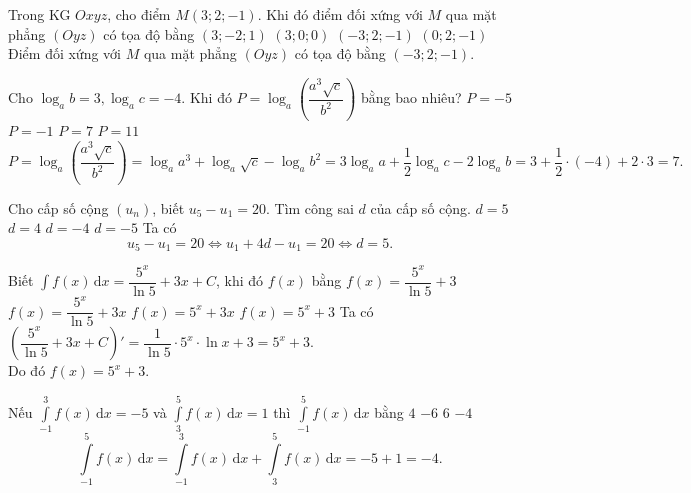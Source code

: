 \begin{ex}%
Trong KG $Oxyz$, cho điểm $M(3;2;-1)$. Khi đó điểm đối xứng với $M$ qua mặt phẳng $(Oyz)$ có tọa độ bằng
\choice 
{$(3;-2;1)$} 
{$(3;0;0)$}
{\True $(-3;2;-1)$} 
{$(0;2;-1)$}
\loigiai
{
Điểm đối xứng với $M$ qua mặt phẳng $(Oyz)$ có tọa độ bằng $(-3;2;-1)$.
}
\end{ex}

\begin{ex}%
Cho $\log_{a}b=3,\log_{a}c=-4$. Khi đó $P=\log_{a}\left (\dfrac{a^3\sqrt{c}}{b^2} \right )$ bằng bao nhiêu?
\choice 
{$P=-5$} 
{$P=-1$}
{\True $P=7$} 
{$P=11$}
\loigiai
{
$$P=\log_{a}\left (\dfrac{a^3\sqrt{c}}{b^2} \right )=\log_{a}a^3+\log_{a}\sqrt{c}-\log_{a}b^2=3\log_{a}a+\dfrac{1}{2}\log_{a}c-2\log_{a}b=3+\dfrac{1}{2}\cdot (-4)+2\cdot 3=7.$$
}
\end{ex}

\begin{ex}%
Cho cấp số cộng $\left (u_n \right )$, biết $u_5-u_1=20$. Tìm công sai $d$ của cấp số cộng.
\choice 
{\True $d=5$} 
{$d=4$}
{$d=-4$} 
{$d=-5$}
\loigiai
{
Ta có 
$$u_5-u_1=20\Leftrightarrow u_1+4d-u_1=20\Leftrightarrow d=5.$$
}
\end{ex}

\begin{ex}%
Biết $\displaystyle\int f(x)\mathrm{\,d}x=\dfrac{5^x}{\ln 5}+3x+C$, khi đó $f(x)$ bằng
\choice 
{$f(x)=\dfrac{5^x}{\ln 5}+3$} 
{$f(x)=\dfrac{5^x}{\ln 5}+3x$}
{$f(x)=5^x+3x$} 
{\True $f(x)=5^x+3$}
\loigiai
{
Ta có $\left(\dfrac{5^x}{\ln 5}+3x+C\right)'=\dfrac{1}{\ln 5}\cdot 5^x\cdot\ln x+3=5^x+3$.\\
Do đó $f(x)=5^x+3$.
}
\end{ex}

\begin{ex}%
Nếu $\displaystyle\int\limits_{-1}^{3}f(x)\mathrm{\,d}x=-5$ và $\displaystyle\int\limits_{3}^{5}f(x)\mathrm{\,d}x=1$ thì $\displaystyle\int\limits_{-1}^{5}f(x)\mathrm{\,d}x$ bằng
\choice 
{$4$} 
{$-6$}
{$6$} 
{\True $-4$}
\loigiai
{
$$\displaystyle\int\limits_{-1}^{5}f(x)\mathrm{\,d}x=\displaystyle\int\limits_{-1}^{3}f(x)\mathrm{\,d}x+\displaystyle\int\limits_{3}^{5}f(x)\mathrm{\,d}x=-5+1=-4.$$
}
\end{ex}

